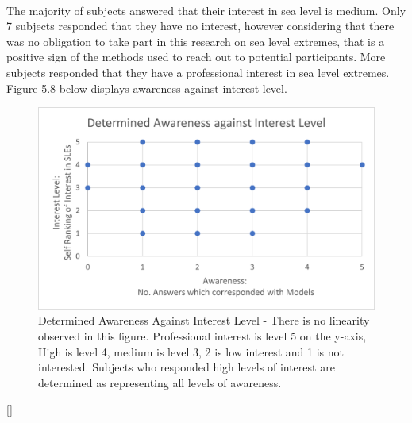 \paragraph{}

The majority of subjects answered that their interest in sea level is medium. Only 7 subjects responded that they have no interest, however considering that there was no obligation to take part in this research on sea level extremes, that is a positive sign of the methods used to reach out to potential participants. More subjects responded that they have a professional interest in sea level extremes. Figure 5.8 below displays awareness against interest level.

\begin{figure}[h!]
    \centering
    \includegraphics{fig_results/aware_vs_interest.png}
    \caption{Determined Awareness Against Interest Level - There is no linearity observed in this figure. Professional interest is level 5 on the y-axis, High  is level 4, medium is level 3, 2 is low interest and 1 is not interested. Subjects who responded high levels of interest are determined as representing all levels of awareness.}
    \label{fig:aware_vs_interest}
\end{figure}[]
\paragraph{}

